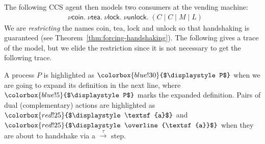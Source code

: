 \documentclass{article}
\def\mystrut{\rule{0pt}{0.68em}}
\newcommand{\act}[1]{\textsf{#1}}
\newcommand{\da}[1]{\overline{\mystrut\textsf{#1}}}
\newcommand{\dak}[1]{\overline{\textsf{#1}}}
\newcommand{\highlightG}[1]{%
  \colorbox{blue!30}{$\displaystyle#1$}}
\newcommand{\highlightR}[1]{%
  \colorbox{red!25}{$\displaystyle#1$}}
\newcommand{\highlightGH}[1]{%
  \colorbox{blue!5}{$\displaystyle#1$}}
\theoremstyle{definition}
\newcommand{\src}[1]{\highlightR{#1}}
\newcommand{\srch}[1]{\highlightG{#1}}
\newcommand{\trgh}[1]{\highlightGH{#1}}
\newcommand{\restr}[2]{\nu #2 . #1}
\begin{document}
\noindent
The following CCS agent then models two consumers at the vending machine:
%
\begin{align*}
  & \nu \act{coin} . \; \nu \act{tea} . \; \nu \act{lock} . \;
\nu \act{unlock} . \; {({C} \mid C \mid {M} \mid L)}
\end{align*}
We are \emph{restricting} the names \act{coin}, \act{tea},
\act{lock} and \act{unlock} so that handshaking is guaranteed
(see Theorem~\ref{thm:forcing-handshaking}).
The following gives a trace of the model, but we elide the restriction
since it is not necessary to get the following trace.

\renewcommand{\restr}[2]{#1}

\iffalse
\newcommand{\asrch}[1]{#1}
\newcommand{\atrgh}[1]{#1}
\newcommand{\asrc}[1]{#1}

\begin{align*}
 \restr{\asrch{C} \mid C \mid \asrch{M}}{\actions{}} \;\;
\equiv \;\;
 \restr{\asrch{C} \mid C \mid V \mid V \mid \asrch{M}}{\actions{}} \;\;
\equiv \;\; & \restr{\atrgh{\asrc{\da{coin}}.\act{tea}.C} \mid \asrc{\da{coin}}.\act{tea}.C \mid \atrgh{\asrc{\act{coin}}.A.\da{tea} \mid \asrc{\act{coin}}.A.\da{tea} \mid M}}{\actions{}} \\
\xrightarrow{\tau} \;\; & \restr{\act{tea}.C \mid \asrc{\da{coin}}.\act{tea}.C \mid A.\da{tea} \mid \asrc{\act{coin}}.A.\da{tea} \mid \asrch{M}}{\actions{}}  \\
\xrightarrow{\tau} \;\; &
 \restr{\act{tea}.C \mid {\act{tea}.C} \mid
A.\da{tea} \mid
A.\da{tea} \mid M}{\actions{}}
\end{align*}
\fi

A process $P$ is highlighted as $\srch{P}$ when we are going to expand
its definition in the next line, where $\trgh{P}$ marks the expanded
definition. Pairs of dual (complementary) actions are highlighted as $\src{\act{a}}$
and $\src{\dak{a}}$ when they are about to handshake via a
$\xrightarrow{\tau}$ step.
\end{document}
